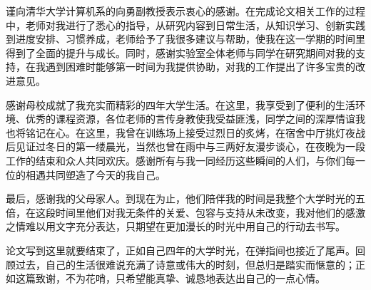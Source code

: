 
\begin{acknowledgements}
谨向清华大学计算机系的向勇副教授表示衷心的感谢。在完成论文相关工作的过程中，老师对我进行了悉心的指导，从研究内容到日常生活，从知识学习、创新实践到进度安排、习惯养成，老师给予了我很多建议与帮助，使我在这一学期的时间里得到了全面的提升与成长。同时，感谢实验室全体老师与同学在研究期间对我的支持，在我遇到困难时能够第一时间为我提供协助，对我的工作提出了许多宝贵的改进意见。

感谢母校成就了我充实而精彩的四年大学生活。在这里，我享受到了便利的生活环境、优秀的课程资源，各位老师的言传身教使我受益匪浅，同学之间的深厚情谊我也将铭记在心。在这里，我曾在训练场上接受过烈日的炙烤，在宿舍中厅挑灯夜战后见证过冬日的第一缕晨光，当然也曾在雨中与三两好友漫步谈心，在夜晚为一段工作的结束和众人共同欢庆。感谢所有与我一同经历这些瞬间的人们，与你们每一位的相遇共同塑造了今天的我自己。

最后，感谢我的父母家人。到现在为止，他们陪伴我的时间是我整个大学时光的五倍，在这段时间里他们对我无条件的关爱、包容与支持从未改变，我对他们的感激之情难以用文字充分表达，只期望在更加漫长的时光中用自己的行动去书写。

论文写到这里就要结束了，正如自己四年的大学时光，在弹指间也接近了尾声。回顾过去，自己的生活很难说充满了诗意或伟大的时刻，但总归是踏实而惬意的；正如这篇致谢，不为花哨，只希望能真挚、诚恳地表达出自己的一点心情。
\end{acknowledgements}
